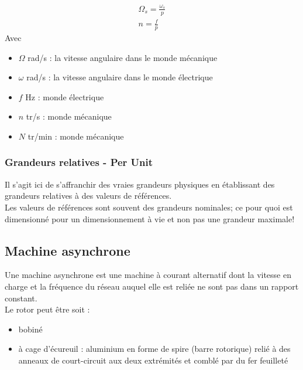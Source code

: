 \documentclass[../main.tex]{subfiles}
\begin{document}
\begin{equation}
\begin{gathered}
    \Omega_s = \frac{\omega_s}{p}\\
    n = \frac{f}{p}
    \end{gathered}
\end{equation}
Avec \begin{itemize}
    \item $\Omega$ rad/s : la vitesse angulaire dans le monde mécanique\\
    \item $\omega$ rad/s : la vitesse angulaire dans le monde électrique\\
    \item $f$ Hz : monde électrique\\
    \item $n$ tr/s : monde mécanique\\
    \item $N$ tr/min : monde mécanique\\
\end{itemize}

\subsubsection{Grandeurs relatives - Per Unit}
Il s'agit ici de s'affranchir des vraies grandeurs physiques en établissant des grandeurs relatives à des valeurs de références.\\

\warning Les valeurs de références sont souvent des grandeurs nominales; ce pour quoi est dimensionné pour un dimensionnement à vie et non pas une grandeur maximale!\\

\subsection{Machine asynchrone}
Une machine asynchrone est une machine à courant alternatif dont la vitesse en charge et la fréquence du réseau auquel elle est reliée ne sont pas dans un rapport constant.\\

Le rotor peut être soit : \begin{itemize}
    \item bobiné\\
    \item à cage d'écureuil : aluminium en forme de spire (barre rotorique) relié à des anneaux de court-circuit aux deux extrémités et comblé par du fer feuilleté\\
\end{itemize}
\end{document}
